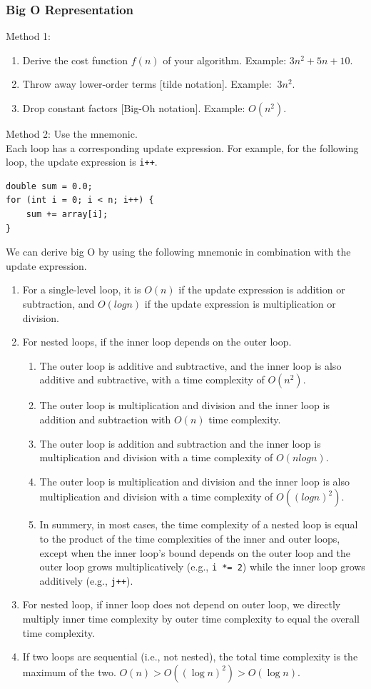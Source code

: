 \documentclass[letterpaper,12pt]{article}
\begin{document}
\subsubsection{Big O Representation}
Method 1:
\begin{enumerate}
    \item Derive the cost function $f(n)$ of your algorithm. Example: $3n^2 + 5n + 10$.
    \item Throw away lower-order terms [tilde notation]. Example: $~3n^2$.
    \item Drop constant factors [Big-Oh notation]. Example: $O(n^2)$.
\end{enumerate}
Method 2: Use the mnemonic.\\
Each loop has a corresponding update expression. For example, for the following loop, the update expression is \texttt{i++}.
\begin{verbatim}
double sum = 0.0;
for (int i = 0; i < n; i++) {
    sum += array[i];
}
\end{verbatim}
We can derive big O by using the following mnemonic in combination with the update expression.
\begin{enumerate}
    \item For a single-level loop, it is $O(n)$ if the update expression is addition or subtraction, and $O(logn)$ if the update expression is multiplication or division.
    \item For nested loops, if the inner loop depends on the outer loop.
    \begin{enumerate}
        \item The outer loop is additive and subtractive, and the inner loop is also additive and subtractive, with a time complexity of $O(n^2)$.
        \item The outer loop is multiplication and division and the inner loop is addition and subtraction with $O(n)$ time complexity.
        \item The outer loop is addition and subtraction and the inner loop is multiplication and division with a time complexity of $O(n logn)$.
        \item The outer loop is multiplication and division and the inner loop is also multiplication and division with a time complexity of $O((log n)^2)$.
        \item In summery, in most cases, the time complexity of a nested loop is equal to the product of the time complexities of the inner and outer loops, except when the inner loop's bound depends on the outer loop and the outer loop grows multiplicatively (e.g., \texttt{i *= 2}) while the inner loop grows additively (e.g., \texttt{j++}).
    \end{enumerate}
    \item For nested loop, if inner loop does not depend on outer loop, we directly multiply inner time complexity by outer time complexity to equal the overall time complexity.
    \item If two loops are sequential (i.e., not nested), the total time complexity is the maximum of the two. $O(n) > O((\log n)^2) > O(\log n)$.
\end{enumerate}
\end{document}
